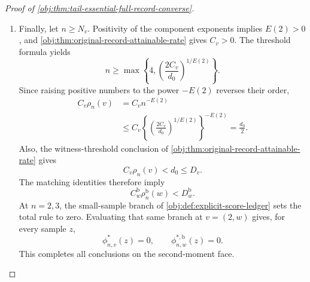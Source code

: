 \begin{proof}[Proof of \cref{obj:thm:tail-essential-full-record-converse}]
\begin{enumerate}
\item
Finally, let \(n\ge N_v\). Positivity of the component exponents implies
\(E(2)>0\), and
\cref{obj:thm:original-record-attainable-rate} gives \(C_v>0\).
The threshold formula yields
\[
n\ge
\max\left\{4,\left(\frac{2C_v}{d_0}\right)^{1/E(2)}\right\}.
\]
Since raising positive numbers to the power \(-E(2)\) reverses their
order,
\[
\begin{aligned}
C_v\rho_n(v)
&=C_vn^{-E(2)}\\
&\le
C_v\left\{
\left(\frac{2C_v}{d_0}\right)^{1/E(2)}
\right\}^{-E(2)}
=\frac{d_0}{2}.
\end{aligned}
\]
Also, the witness-threshold conclusion of
\cref{obj:thm:original-record-attainable-rate} gives
\[
C_v\rho_n(v)<d_0\le D_v.
\]
The matching identities therefore imply
\[
C_w^{\mathrm b}\rho_n^{\mathrm b}(w)<D_w^{\mathrm b}.
\]
At \(n=2,3\), the small-sample branch of
\cref{obj:def:explicit-score-ledger} sets the total rule to zero.
Evaluating that same branch at \(v=(2,w)\) gives, for every sample \(z\),
\[
\phi^*_{n,v}(z)=0,\qquad
\phi^{*,\mathrm b}_{n,w}(z)=0.
\]
This completes all conclusions on the second-moment face.
\end{enumerate}
\end{proof}

